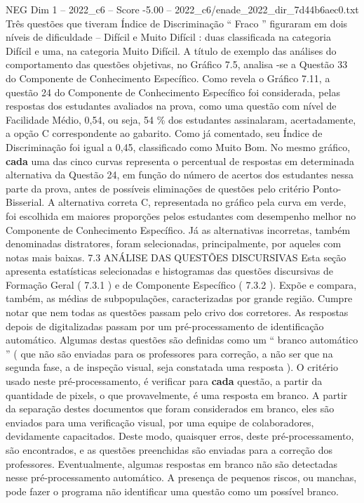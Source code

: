 \begin{textsample}{NEG Dim 1 – 2022\_c6 – Score -5.00 – 2022\_c6/enade\_2022\_dir\_7d44b6aec0.txt}
Três questões que tiveram Índice de Discriminação “ Fraco ” figuraram em dois níveis de dificuldade – Difícil e Muito Difícil : duas classificada na categoria Difícil e uma, na categoria Muito Difícil.
A título de exemplo das análises do comportamento das questões objetivas, no Gráfico 7.5, analisa -se a Questão 33 do Componente de Conhecimento Específico.
Como revela o Gráfico 7.11, a questão 24 do Componente de Conhecimento Específico foi considerada, pelas respostas dos estudantes avaliados na prova, como uma questão com nível de Facilidade Médio, 0,54, ou seja, 54 \% dos estudantes assinalaram, acertadamente, a opção C correspondente ao gabarito.
Como já comentado, seu Índice de Discriminação foi igual a 0,45, classificado como Muito Bom.
No mesmo gráfico, \textbf{cada} uma das cinco curvas representa o percentual de respostas em determinada alternativa da Questão 24, em função do número de acertos dos estudantes nessa parte da prova, antes de possíveis eliminações de questões pelo critério Ponto-Bisserial.
A alternativa correta C, representada no gráfico pela curva em verde, foi escolhida em maiores proporções pelos estudantes com desempenho melhor no Componente de Conhecimento Específico.
Já as alternativas incorretas, também denominadas distratores, foram selecionadas, principalmente, por aqueles com notas mais baixas. 7.3 ANÁLISE DAS QUESTÕES DISCURSIVAS Esta seção apresenta estatísticas selecionadas e histogramas das questões discursivas de Formação Geral ( 7.3.1 ) e de Componente Específico ( 7.3.2 ).
Expõe e compara, também, as médias de subpopulações, caracterizadas por grande região.
Cumpre notar que nem todas as questões passam pelo crivo dos corretores.
As respostas depois de digitalizadas passam por um pré-processamento de identificação automático.
Algumas destas questões são definidas como um “ branco automático ” ( que não são enviadas para os professores para correção, a não ser que na segunda fase, a de inspeção visual, seja constatada uma resposta ).
O critério usado neste pré-processamento, é verificar para \textbf{cada} questão, a partir da quantidade de pixels, o que provavelmente, é uma resposta em branco.
A partir da separação destes documentos que foram considerados em branco, eles são enviados para uma verificação visual, por uma equipe de colaboradores, devidamente capacitados.
Deste modo, quaisquer erros, deste pré-processamento, são encontrados, e as questões preenchidas são enviadas para a correção dos professores.
Eventualmente, algumas respostas em branco não são detectadas nesse pré-processamento automático.
A presença de pequenos riscos, ou manchas, pode fazer o programa não identificar uma questão como um possível branco.

\end{textsample}
